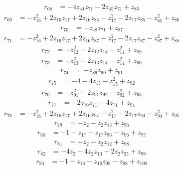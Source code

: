 \begin{align*}
r_{68} &= -4z_{44}z_{71} - 2z_{45}z_{71} + z_{85}
\end{align*}
\begin{align*}
r_{69} &= -z_{16}^{2} + 2z_{16}z_{17} + 2z_{16}z_{85} - z_{17}^{2} - 2z_{17}z_{85} - z_{85}^{2} + z_{86}
\end{align*}
\begin{align*}
r_{70} &= -z_{48}z_{71} + z_{87}
\end{align*}
\begin{align*}
r_{71} &= -z_{16}^{2} + 2z_{16}z_{17} + 2z_{16}z_{87} - z_{17}^{2} - 2z_{17}z_{87} - z_{87}^{2} + z_{88}
\end{align*}
\begin{align*}
r_{72} &= -z_{12}^{2} + 2z_{12}z_{14} - z_{14}^{2} + z_{89}
\end{align*}
\begin{align*}
r_{73} &= -z_{13}^{2} + 2z_{13}z_{14} - z_{14}^{2} + z_{90}
\end{align*}
\begin{align*}
r_{74} &= -z_{89}z_{90} + z_{91}
\end{align*}
\begin{align*}
r_{75} &= -4 - 4z_{15} - z_{15}^{2} + z_{92}
\end{align*}
\begin{align*}
r_{76} &= -z_{91}^{2} + 2z_{91}z_{92} - z_{92}^{2} + z_{93}
\end{align*}
\begin{align*}
r_{77} &= -2z_{70}z_{71} - 4z_{71} + z_{94}
\end{align*}
\begin{align*}
r_{78} &= -z_{16}^{2} + 2z_{16}z_{17} + 2z_{16}z_{94} - z_{17}^{2} - 2z_{17}z_{94} - z_{94}^{2} + z_{95}
\end{align*}
\begin{align*}
r_{79} &= -z_{2} - z_{2}z_{13} + z_{96}
\end{align*}
\begin{align*}
r_{80} &= -1 - z_{17} - z_{17}z_{96} - z_{96} + z_{97}
\end{align*}
\begin{align*}
r_{81} &= -z_{2} - z_{2}z_{12} + z_{98}
\end{align*}
\begin{align*}
r_{82} &= -4z_{2} - 4z_{2}z_{13} - 2z_{2}z_{25} + z_{99}
\end{align*}
\begin{align*}
r_{83} &= -1 - z_{16} - z_{16}z_{98} - z_{98} + z_{100}
\end{align*}
